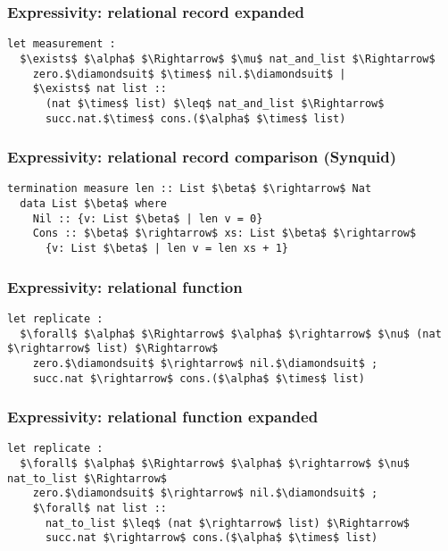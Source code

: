 \documentclass{beamer}
\begin{document}
\begin{frame}[fragile]
  \frametitle{Expressivity: relational record expanded}

  \begin{lstlisting}[]
  let measurement : 
  $\exists$ $\alpha$ $\Rightarrow$ $\mu$ nat_and_list $\Rightarrow$ 
    zero.$\diamondsuit$ $\times$ nil.$\diamondsuit$ | 
    $\exists$ nat list :: 
      (nat $\times$ list) $\leq$ nat_and_list $\Rightarrow$ 
      succ.nat.$\times$ cons.($\alpha$ $\times$ list)
  \end{lstlisting}

\end{frame}

\begin{frame}[fragile]
  \frametitle{Expressivity: relational record comparison (Synquid)}

  \begin{lstlisting}[keywords={termination, measure, data, where}]
  termination measure len :: List $\beta$ $\rightarrow$ Nat 
  data List $\beta$ where
    Nil :: {v: List $\beta$ | len v = 0}
    Cons :: $\beta$ $\rightarrow$ xs: List $\beta$ $\rightarrow$ 
      {v: List $\beta$ | len v = len xs + 1}

  \end{lstlisting}
\end{frame}

\begin{frame}[fragile]
  \frametitle{Expressivity: relational function}

  \begin{lstlisting}[]
  let replicate : 
  $\forall$ $\alpha$ $\Rightarrow$ $\alpha$ $\rightarrow$ $\nu$ (nat $\rightarrow$ list) $\Rightarrow$ 
    zero.$\diamondsuit$ $\rightarrow$ nil.$\diamondsuit$ ; 
    succ.nat $\rightarrow$ cons.($\alpha$ $\times$ list)
  \end{lstlisting}


\end{frame}

\begin{frame}[fragile]

  \frametitle{Expressivity: relational function expanded}

  \begin{lstlisting}[]
  let replicate : 
  $\forall$ $\alpha$ $\Rightarrow$ $\alpha$ $\rightarrow$ $\nu$ nat_to_list $\Rightarrow$ 
    zero.$\diamondsuit$ $\rightarrow$ nil.$\diamondsuit$ ; 
    $\forall$ nat list :: 
      nat_to_list $\leq$ (nat $\rightarrow$ list) $\Rightarrow$ 
      succ.nat $\rightarrow$ cons.($\alpha$ $\times$ list)
  \end{lstlisting}

\end{frame}
\end{document}

